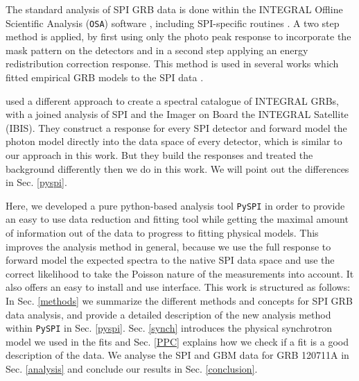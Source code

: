 \documentclass[twocolumn,traditabstract]{aa}
\begin{document}
The standard analysis of SPI GRB data is done within the INTEGRAL Offline Scientific Analysis ({\tt OSA}) software \citep{osa}, including SPI-specific routines \citep{Diehl+2003}. A two step method is applied, by first using only the photo peak response to incorporate the mask pattern on the detectors and in a second step applying an energy redistribution correction response. This method is used in several works which fitted empirical GRB models to the SPI data \citep{Malaguti-2003, Mereghetti-2003, Mereghetti-2003.2, Kienlin-2003, Kienlin-2003.2,Beckmann-2004, Moran-2005, Filliatre-2005.1, Filliatre-2005.2, McBreen-2006, Grebenev-2007, McGlynn-2008, Foley-2008, McGlynn-2009, Martin-Carrillo-2014}.

\citet{Bosnjak-2014} used a different approach to create a spectral catalogue of INTEGRAL GRBs, with a joined analysis of SPI and the Imager on Board the INTEGRAL Satellite (IBIS). They construct a response for every SPI detector and forward model the photon model directly into the data space of every detector, which is similar to our approach in this work. But they build the responses and treated the background differently then we do in this work. We will point out the differences in Sec. \ref{pyspi}.

Here, we developed a pure python-based analysis tool {\tt PySPI} in order to provide an easy to use data reduction and fitting tool while getting the maximal amount of information out of the data to progress to fitting physical models. This improves the analysis method in general, because we use the full response to forward model the expected spectra to the native SPI data space and use the correct likelihood to take the Poisson nature of the measurements into account. It also offers an easy to install and use interface.
This work is structured as follows: In Sec. \ref{methods} we summarize the different methods and concepts for SPI GRB data analysis, and provide a detailed description of the new analysis method within {\tt PySPI} in Sec. \ref{pyspi}. Sec. \ref{synch} introduces the physical synchrotron model we used in the fits and Sec. \ref{PPC} explains how we check if a fit is a good description of the data. We analyse the SPI and GBM data for GRB 120711A in Sec. \ref{analysis} and conclude our results in Sec. \ref{conclusion}.
\end{document}
